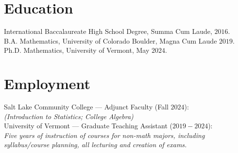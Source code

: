 \documentclass[letterpaper]{article}
\begin{document}
	\thispagestyle{firststyle}
	\section*{Education}
	
	\noindent International Baccalaureate High School Degree, Summa Cum Laude, $2016.$\\
	
	\noindent B.A. Mathematics, University of Colorado Boulder, Magna Cum Laude $2019.$\\
	
	\noindent Ph.D. Mathematics, University of Vermont, May $2024.$ 
	
	\section*{Employment}
	\noindent Salt Lake Community College --- Adjunct Faculty (Fall $2024$):\\
	\textit{(Introduction to Statistics; College Algebra)}\\
	
	\noindent University of Vermont --- Graduate Teaching Assistant ($2019-2024$):\\
	\textit{Five years of instruction of courses for non-math majors, including syllabus/course planning, all lecturing and creation of exams.}
	
\end{document}
